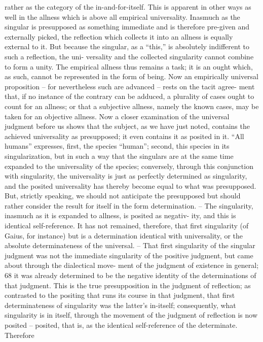 rather as the category of the in-and-for-itself.
This is apparent in other ways as well in the allness which is above all
empirical universality. Inasmuch as the singular is presupposed as something
immediate and is therefore pre-given and externally picked, the reflection
which collects it into an allness is equally external to it. But because the
singular, as a “this,” is absolutely indifferent to such a reflection, the uni-
versality and the collected singularity cannot combine to form a unity.
The empirical allness thus remains a task; it is an ought which, as such,
cannot be represented in the form of being. Now an empirically universal
proposition – for nevertheless such are advanced – rests on the tacit agree-
ment that, if no instance of the contrary can be adduced, a plurality of cases
ought to count for an allness; or that a subjective allness, namely the known
cases, may be taken for an objective allness.
Now a closer examination of the universal judgment before us shows
that the subject, as we have just noted, contains the achieved universality as
presupposed; it even contains it as posited in it. “All humans” expresses, first,
the species “human”; second, this species in its singularization, but in such
a way that the singulars are at the same time expanded to the universality
of the species; conversely, through this conjunction with singularity, the
universality is just as perfectly determined as singularity, and the posited
universality has thereby become equal to what was presupposed.
But, strictly speaking, we should not anticipate the presupposed but
should rather consider the result for itself in the form determination. –
The singularity, inasmuch as it is expanded to allness, is posited as negativ-
ity, and this is identical self-reference. It has not remained, therefore, that
first singularity (of Gaius, for instance) but is a determination identical
with universality, or the absolute determinateness of the universal. – That
first singularity of the singular judgment was not the immediate singularity
of the positive judgment, but came about through the dialectical move-
ment of the judgment of existence in general; 68 it was already determined
to be the negative identity of the determinations of that judgment. This is
the true presupposition in the judgment of reflection; as contrasted to the
positing that runs its course in that judgment, that first determinateness
of singularity was the latter's in-itself; consequently, what singularity is in
itself, through the movement of the judgment of reflection is now posited –
posited, that is, as the identical self-reference of the determinate. Therefore
